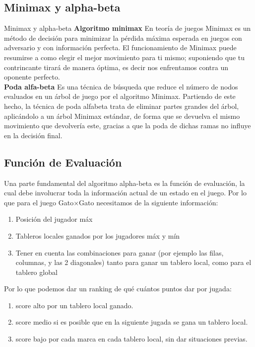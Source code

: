 \documentclass{beamer}
\begin{document}
\subsection{Minimax y alpha-beta}
\begin{frame}{Minimax y alpha-beta}
	\textbf{Algoritmo minimax} En teoría de juegos Minimax es un método de decisión para minimizar la pérdida máxima esperada en juegos con adversario y con información perfecta. El funcionamiento de Minimax puede resumirse a como elegir el mejor movimiento para ti mismo; suponiendo que tu contrincante tirará de manera óptima, es decir nos enfrentamos contra un oponente perfecto. \\
	\textbf{Poda alfa-beta} Es una técnica de búsqueda que reduce el número de nodos evaluados en un árbol de juego por el algoritmo Minimax. Partiendo de este hecho, la técnica de poda alfabeta trata de eliminar partes grandes del árbol, aplicándolo a un árbol Minimax estándar, de forma que se devuelva el mismo movimiento que devolvería este, gracias a que la poda de dichas ramas no influye en la decisión final.
\end{frame}
\subsection{Función de Evaluación}
Una parte fundamental del algoritmo alpha-beta es la función de evaluación, la cual debe involucrar toda la información actual de un estado en el juego. Por lo que para el juego Gato×Gato necesitamos de la siguiente información:
\begin{enumerate}
\item Posición del jugador máx
\item Tableros locales ganados por los jugadores máx y mín
\item Tener en cuenta las combinaciones para ganar (por ejemplo las filas, columnas,
y las 2 diagonales) tanto para ganar un tablero local, como para el tablero global
\end{enumerate}
Por lo que podemos dar un ranking de qué cuántos puntos dar por jugada:
\begin{enumerate}
\item score alto por un tablero local ganado.
\item score medio si es posible que en la siguiente jugada se gana un tablero local.
\item score bajo por cada marca en cada tablero local, sin dar situaciones previas.
\end{enumerate}
\end{document}
